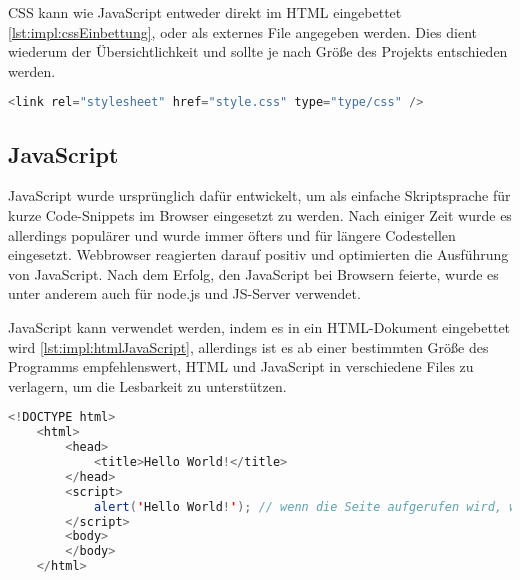 CSS kann wie JavaScript entweder direkt im HTML eingebettet \ref{lst:impl:cssEinbettung}, oder als externes File angegeben werden. Dies dient wiederum der Übersichtlichkeit und sollte je nach Größe des Projekts entschieden werden.
\cite{durchstartenHTML}

\begin{lstlisting}[language=java,caption=CSS Einbettung,label=lst:impl:cssEinbettung]
    <link rel="stylesheet" href="style.css" type="type/css" />
\end{lstlisting}
 
\subsection{JavaScript}
JavaScript wurde ursprünglich dafür entwickelt, um als einfache Skriptsprache für kurze Code-Snippets im Browser eingesetzt zu werden. Nach einiger Zeit wurde es allerdings populärer und wurde immer öfters und für längere Codestellen eingesetzt. Webbrowser reagierten darauf positiv und optimierten die Ausführung von JavaScript. Nach dem Erfolg, den JavaScript bei Browsern feierte, wurde es unter anderem auch für node.js und JS-Server verwendet.
\cite{typeJavaScript}


JavaScript kann verwendet werden, indem es in ein HTML-Dokument eingebettet wird \ref{lst:impl:htmlJavaScript}, allerdings ist es ab einer bestimmten Größe des Programms empfehlenswert, HTML und JavaScript in verschiedene Files zu verlagern, um die Lesbarkeit zu unterstützen.
\cite{JavaScriptJavaEntwickler} 

\begin{lstlisting}[language=java,caption=HTML mit eingebettetem JavaScript,label=lst:impl:htmlJavaScript]
    <!DOCTYPE html>
    <html>
        <head>
            <title>Hello World!</title>
        </head>
        <script>
            alert('Hello World!'); // wenn die Seite aufgerufen wird, wird mithilfe von JavaScript ein Alert-Fenster mit 'Hello World!' ausgegeben
        </script>
        <body>
        </body>
    </html>
\end{lstlisting}
